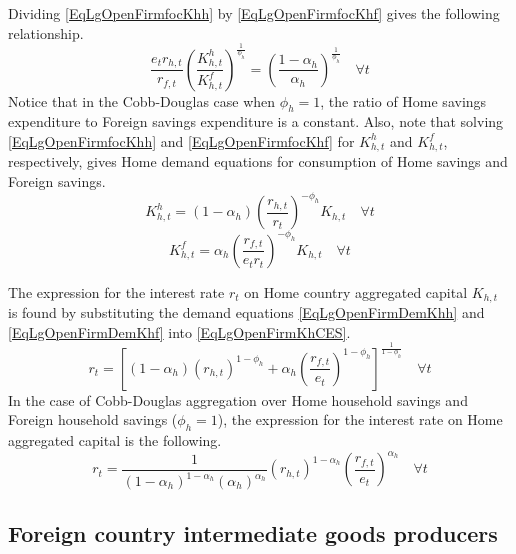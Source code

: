 \documentclass[letterpaper,12pt]{article}
\theoremstyle{definition}
\begin{document}
    Dividing \eqref{EqLgOpenFirmfocKhh} by \eqref{EqLgOpenFirmfocKhf} gives the following relationship.
    \begin{equation}\label{EqLgOpenFirmFracCapDomFor}
      \frac{e_t r_{h,t}}{r_{f,t}}\left(\frac{K^h_{h,t}}{K^f_{h,t}}\right)^{\frac{1}{\phi_h}} = \left(\frac{1-\alpha_h}{\alpha_h}\right)^{\frac{1}{\phi_h}} \quad\forall t
    \end{equation}
    Notice that in the Cobb-Douglas case when $\phi_h=1$, the ratio of Home savings expenditure to Foreign savings expenditure is a constant. Also, note that solving \eqref{EqLgOpenFirmfocKhh} and \eqref{EqLgOpenFirmfocKhf} for $K^h_{h,t}$ and $K^f_{h,t}$, respectively, gives Home demand equations for consumption of Home savings and Foreign savings.
    \begin{equation}\label{EqLgOpenFirmDemKhh}
      K^h_{h,t} = (1-\alpha_h)\left(\frac{r_{h,t}}{r_t}\right)^{-\phi_h}K_{h,t} \quad\forall t
    \end{equation}
    \begin{equation}\label{EqLgOpenFirmDemKhf}
      K^f_{h,t} = \alpha_h \left(\frac{r_{f,t}}{e_t r_t}\right)^{-\phi_h}K_{h,t} \quad\forall t
    \end{equation}

    The expression for the interest rate $r_t$ on Home country aggregated capital $K_{h,t}$ is found by substituting the demand equations \eqref{EqLgOpenFirmDemKhh} and \eqref{EqLgOpenFirmDemKhf} into \eqref{EqLgOpenFirmKhCES}.
    \begin{equation}\label{EqLgOpenFirmAggR_h}
      r_t = \left[(1-\alpha_h)\left(r_{h,t}\right)^{1-\phi_h} + \alpha_h\left(\frac{r_{f,t}}{e_t}\right)^{1-\phi_h}\right]^{\frac{1}{1-\phi_h}} \quad\forall t
    \end{equation}
    In the case of Cobb-Douglas aggregation over Home household savings and Foreign household savings ($\phi_h=1$), the expression for the interest rate on Home aggregated capital is the following.
    \begin{equation}\label{EqLgOpenFirmAggR_h_Cobb}
      r_t = \frac{1}{(1-\alpha_h)^{1-\alpha_h}(\alpha_h)^{\alpha_h}} \left(r_{h,t}\right)^{1-\alpha_h}\left(\frac{r_{f,t}}{e_t}\right)^{\alpha_h} \quad\forall t
    \end{equation}


  \subsection{Foreign country intermediate goods producers}\label{SecLgOpenFirmIntd_F}
\end{document}
